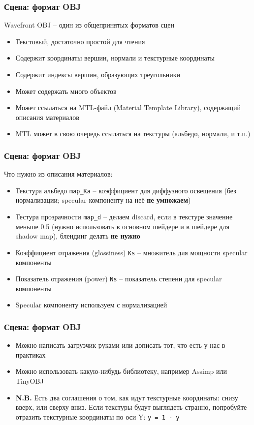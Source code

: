 \documentclass[10pt]{beamer}
\begin{document}
\begin{frame}[fragile]
\frametitle{Сцена: формат OBJ}
Wavefront OBJ -- один из общепринятых форматов сцен
\begin{itemize}
\item Текстовый, достаточно простой для чтения
\item Содержит координаты вершин, нормали и текстурные координаты
\item Содержит индексы вершин, образующих треугольники
\item Может содержать много объектов
\item Может ссылаться на MTL-файл (Material Template Library), содержащий описания материалов
\item MTL может в свою очередь ссылаться на текстуры (альбедо, нормали, и т.п.)
\end{itemize}
\end{frame}

\begin{frame}[fragile]
\frametitle{Сцена: формат OBJ}
Что нужно из описания материалов:
\begin{itemize}
\item Текстура альбедо \verb|map_Ka| -- коэффициент для диффузного освещения (без нормализации; specular компоненту на неё \textbf{не умножаем})
\item Тестура прозрачности \verb|map_d| -- делаем discard, если в текстуре значение меньше 0.5 (нужно использовать в основном шейдере и в шейдере для shadow map), блендинг делать \textbf{не нужно}
\item Коэффициент отражения (glossiness) \verb|Ks| -- множитель для мощности specular компоненты
\item Показатель отражения (power) \verb|Ns| -- показатель степени для specular компоненты
\item Specular компоненту используем с нормализацией
\end{itemize}
\end{frame}

\begin{frame}[fragile]
\frametitle{Сцена: формат OBJ}
\begin{itemize}
\item Можно написать загрузчик руками или дописать тот, что есть у нас в практиках
\item Можно использовать какую-нибудь библиотеку, например Assimp или TinyOBJ
\item \textbf{N.B.} Есть два соглашения о том, как идут текстурные координаты: снизу вверх, или сверху вниз. Если текстуры будут выглядеть странно, попробуйте отразить текстурные координаты по оси Y: \verb|y = 1 - y|
\end{itemize}
\end{frame}
\end{document}
